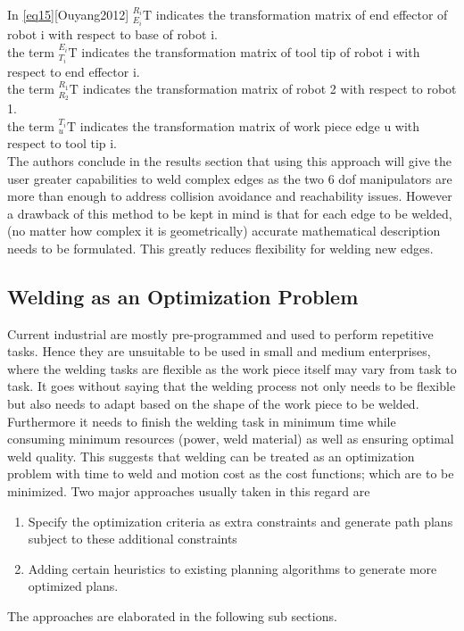 In \eqref{eq15}[Ouyang2012] ${_{E_{i}}^{R_{i}}\textrm{T}} $ indicates the transformation matrix of end effector of robot i with respect to base of robot i. \\
the term ${_{T_{i}}^{E_{i}}\textrm{T}} $ indicates the transformation matrix of tool tip of robot i with respect to end effector i. \\ 
the term ${_{R_{2}}^{R_{1}}\textrm{T}} $ indicates the transformation matrix of robot 2 with respect to robot 1. \\ 
the term ${_{u}^{T_{i}}\textrm{T}} $ indicates the transformation matrix of work piece edge u with respect to tool tip i.\\
The authors conclude in the results section that using this approach will give the user greater capabilities to weld complex edges as the two 6 dof manipulators are more than enough to address collision avoidance and reachability issues. However a drawback of this method to be kept in mind is that for each edge to be welded, (no matter how complex it is geometrically) accurate mathematical description needs to be formulated. This greatly reduces flexibility for welding new edges. 

\newpage
\subsection{Welding as an Optimization Problem}
Current industrial are mostly pre-programmed and used to perform repetitive tasks. Hence they are unsuitable to be used in small and medium enterprises, where the welding tasks are flexible as the work piece itself may vary from task to task. It goes without saying that the welding process not only needs to be flexible but also needs to adapt based on the shape of the work piece to be welded. Furthermore it needs to finish the welding task in minimum time while consuming minimum resources (power, weld material) as well as ensuring optimal weld quality. This suggests that welding can be treated as an optimization problem with time to weld and motion cost as the cost functions; which are to be minimized. Two major approaches usually taken in this regard are 
\begin{enumerate}
\item Specify the optimization criteria as extra constraints and generate path plans subject to these additional constraints
\item Adding certain heuristics to existing planning algorithms to generate more optimized plans.
\end{enumerate}
The approaches are elaborated in the following sub sections.
